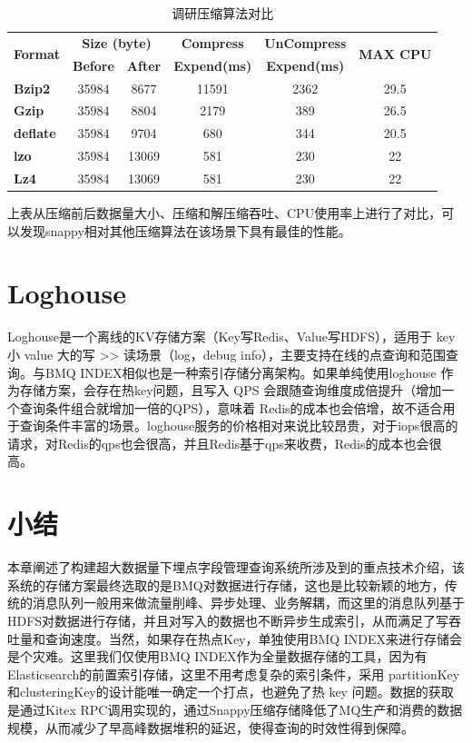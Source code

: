 \begin{table}[htb]\footnotesize  
\centering  
\caption{调研压缩算法对比}  
\vspace{2mm}  
\begin{tabular}{lccccc}  
\toprule  
\multirow{2}{*}{\textbf{Format}} & \multicolumn{2}{c}{\textbf{Size (byte)}} & \textbf{Compress} & \textbf{UnCompress} & \multirow{2}{*}{\textbf{MAX CPU}} \\  
 & \textbf{Before} & \textbf{After} & \textbf{Expend(ms)} & \textbf{Expend(ms)} & \textbf{($\%$)} \\  
\midrule  
\textbf{Bzip2} & 35984 & 8677 & 11591 & 2362 & 29.5 \\ \hline  
\textbf{Gzip} & 35984 & 8804 & 2179 & 389 & 26.5 \\ \hline  
\textbf{deflate} & 35984 & 9704 & 680 & 344 & 20.5 \\ \hline  
\textbf{lzo} & 35984 & 13069 & 581 & 230 & 22 \\ \hline  
\textbf{Lz4} & 35984 & 13069 & 581 & 230 & 22 \\ \hline  
\bottomrule  
\end{tabular}  
\label{table:suanfa}  
\end{table}


上表从压缩前后数据量大小、压缩和解压缩吞吐、CPU使用率上进行了对比，可以发现snappy相对其他压缩算法在该场景下具有最佳的性能。
\section{Loghouse}  
Loghouse是一个离线的KV存储方案（Key写Redis、Value写HDFS），适用于 key 小 value 大的写 >> 读场景（log，debug info），主要支持在线的点查询和范围查询。与BMQ INDEX相似也是一种索引存储分离架构。如果单纯使用loghouse 作为存储方案，会存在热key问题，且写入 QPS 会跟随查询维度成倍提升（增加一个查询条件组合就增加一倍的QPS），意味着 Redis的成本也会倍增，故不适合用于查询条件丰富的场景。loghouse服务的价格相对来说比较昂贵，对于iops很高的请求，对Redis的qps也会很高，并且Redis基于qps来收费，Redis的成本也会很高。
\section{小结}  
本章阐述了构建超大数据量下埋点字段管理查询系统所涉及到的重点技术介绍，该系统的存储方案最终选取的是BMQ对数据进行存储，这也是比较新颖的地方，传统的消息队列一般用来做流量削峰、异步处理、业务解耦，而这里的消息队列基于HDFS对数据进行存储，并且对写入的数据也不断异步生成索引，从而满足了写吞吐量和查询速度。当然，如果存在热点Key，单独使用BMQ INDEX来进行存储会是个灾难。这里我们仅使用BMQ INDEX作为全量数据存储的工具，因为有Elasticsearch的前置索引存储，这里不用考虑复杂的索引条件，采用 partitionKey和clusteringKey的设计能唯一确定一个打点，也避免了热 key 问题。数据的获取是通过Kitex RPC调用实现的，通过Snappy压缩存储降低了MQ生产和消费的数据规模，从而减少了早高峰数据堆积的延迟，使得查询的时效性得到保障。

